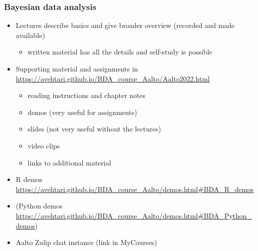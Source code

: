 \documentclass[english]{beamer}
\begin{document}
\begin{frame}
  \frametitle{Bayesian data analysis}  %

  \begin{itemize}
  \item Lectures describe basics and give broader overview (recorded
    and made available)
    \begin{itemize}
    \item written material has all the details and self-study
      is possible
    \end{itemize}
  \item Supporting material and assignments in
    {\small\url{https://avehtari.github.io/BDA_course_Aalto/Aalto2022.html}}
    \begin{itemize}
    \item reading instructions and chapter notes
    \item demos (very useful for assignments)
    \item slides (not very useful without the lectures)
    \item video clips
    \item links to additional material
    \end{itemize}
   \item R demos {\small\url{https://avehtari.github.io/BDA_course_Aalto/demos.html\#BDA_R_demos}}
  \item (Python demos {\small\url{https://avehtari.github.io/BDA_course_Aalto/demos.html\#BDA_Python_demos})}
  \item Aalto Zulip chat instance (link in MyCourses)
  \end{itemize}

\end{frame}
\end{document}
